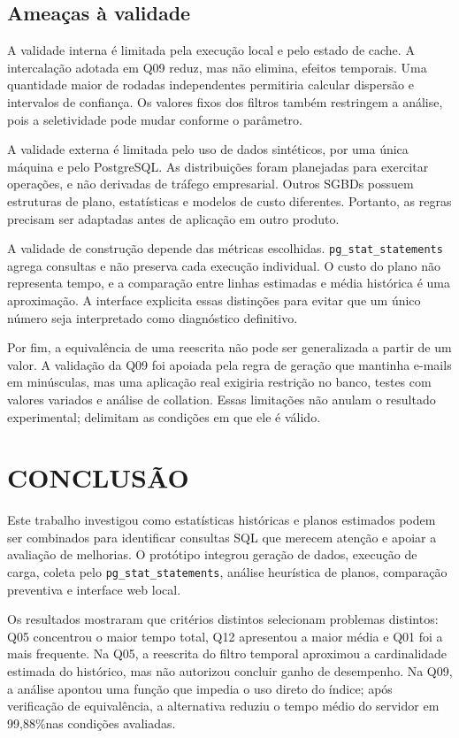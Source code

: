 \documentclass{UNESC}
\newcommand{\codigo}[1]{\texttt{#1}}
\newcommand{\perc}{\%}
\begin{document}
\subsection{Ameaças à validade}

A validade interna é limitada pela execução local e pelo estado de cache. A intercalação adotada em Q09 reduz, mas não elimina, efeitos temporais. Uma quantidade maior de rodadas independentes permitiria calcular dispersão e intervalos de confiança. Os valores fixos dos filtros também restringem a análise, pois a seletividade pode mudar conforme o parâmetro.

A validade externa é limitada pelo uso de dados sintéticos, por uma única máquina e pelo PostgreSQL. As distribuições foram planejadas para exercitar operações, e não derivadas de tráfego empresarial. Outros SGBDs possuem estruturas de plano, estatísticas e modelos de custo diferentes. Portanto, as regras precisam ser adaptadas antes de aplicação em outro produto.

A validade de construção depende das métricas escolhidas. \codigo{pg\_stat\_statements} agrega consultas e não preserva cada execução individual. O custo do plano não representa tempo, e a comparação entre linhas estimadas e média histórica é uma aproximação. A interface explicita essas distinções para evitar que um único número seja interpretado como diagnóstico definitivo.

Por fim, a equivalência de uma reescrita não pode ser generalizada a partir de um valor. A validação da Q09 foi apoiada pela regra de geração que mantinha e-mails em minúsculas, mas uma aplicação real exigiria restrição no banco, testes com valores variados e análise de collation. Essas limitações não anulam o resultado experimental; delimitam as condições em que ele é válido.

\section{CONCLUSÃO}

Este trabalho investigou como estatísticas históricas e planos estimados podem ser combinados para identificar consultas SQL que merecem atenção e apoiar a avaliação de melhorias. O protótipo integrou geração de dados, execução de carga, coleta pelo \codigo{pg\_stat\_statements}, análise heurística de planos, comparação preventiva e interface web local.

Os resultados mostraram que critérios distintos selecionam problemas distintos: Q05 concentrou o maior tempo total, Q12 apresentou a maior média e Q01 foi a mais frequente. Na Q05, a reescrita do filtro temporal aproximou a cardinalidade estimada do histórico, mas não autorizou concluir ganho de desempenho. Na Q09, a análise apontou uma função que impedia o uso direto do índice; após verificação de equivalência, a alternativa reduziu o tempo médio do servidor em 99,88\perc nas condições avaliadas.
\end{document}
